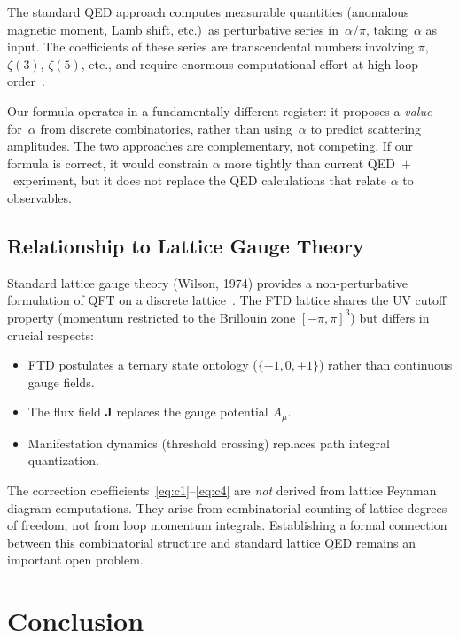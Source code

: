 \documentclass[11pt,twoside]{article}
\theoremstyle{remark}
\begin{document}
The standard QED approach computes measurable quantities (anomalous magnetic moment, Lamb shift, etc.)\ as perturbative series in~$\alpha/\pi$, taking~$\alpha$ as input.
The coefficients of these series are transcendental numbers involving $\pi$, $\zeta(3)$, $\zeta(5)$, etc., and require enormous computational effort at high loop order~\cite{Aoyama2018}.

Our formula operates in a fundamentally different register: it proposes a \emph{value} for~$\alpha$ from discrete combinatorics, rather than using~$\alpha$ to predict scattering amplitudes.
The two approaches are complementary, not competing.
If our formula is correct, it would constrain $\alpha$ more tightly than current QED~$+$~experiment, but it does not replace the QED calculations that relate $\alpha$ to observables.


\subsection{Relationship to Lattice Gauge Theory}
\label{sec:lattice}

Standard lattice gauge theory (Wilson, 1974) provides a non-perturbative formulation of QFT on a discrete lattice~\cite{Wilson1974}.
The FTD lattice shares the UV cutoff property (momentum restricted to the Brillouin zone $[-\pi, \pi]^3$) but differs in crucial respects:
\begin{itemize}[nosep]
    \item FTD postulates a ternary state ontology ($\{-1, 0, +1\}$) rather than continuous gauge fields.
    \item The flux field $\mathbf{J}$ replaces the gauge potential $A_\mu$.
    \item Manifestation dynamics (threshold crossing) replaces path integral quantization.
\end{itemize}

The correction coefficients~\eqref{eq:c1}--\eqref{eq:c4} are \emph{not} derived from lattice Feynman diagram computations.
They arise from combinatorial counting of lattice degrees of freedom, not from loop momentum integrals.
Establishing a formal connection between this combinatorial structure and standard lattice QED remains an important open problem.


\section{Conclusion}
\label{sec:conclusion}
\end{document}
